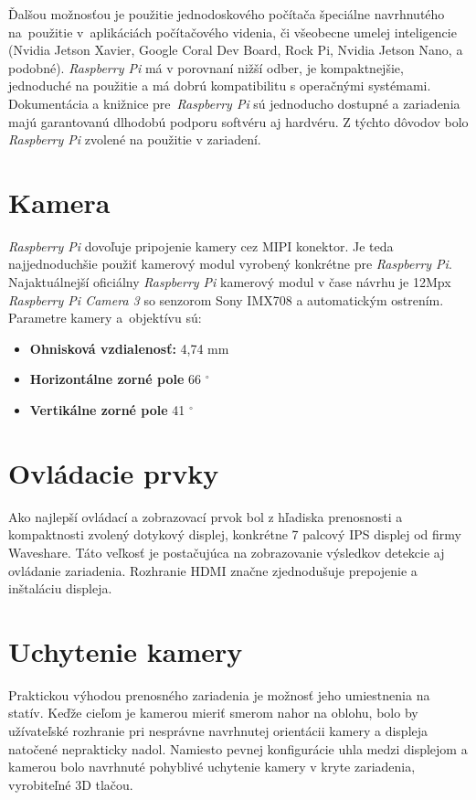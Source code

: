         Ďalšou možnosťou je použitie jednodoskového počítača špeciálne navrhnutého na~použitie v~aplikáciách počítačového videnia, či všeobecne umelej inteligencie (Nvidia Jetson Xavier, Google Coral Dev Board, Rock Pi, Nvidia Jetson Nano, a podobné). \emph{Raspberry Pi} má v porovnaní nižší odber, je kompaktnejšie, jednoduché na použitie a má dobrú kompatibilitu s operačnými systémami. Dokumentácia a knižnice pre~\emph{Raspberry Pi} sú jednoducho dostupné a zariadenia majú garantovanú dlhodobú podporu softvéru aj hardvéru. Z týchto dôvodov bolo \emph{Raspberry Pi} zvolené na použitie v zariadení.

    \section{Kamera}

        \emph{Raspberry Pi} dovoľuje pripojenie kamery cez MIPI konektor. Je teda najjednoduchšie použiť kamerový modul vyrobený konkrétne pre \emph{Raspberry Pi}. Najaktuálnejší oficiálny \emph{Raspberry Pi} kamerový modul v čase návrhu je 12Mpx \emph{Raspberry Pi Camera 3} so senzorom Sony IMX708 a automatickým ostrením. Parametre kamery a~objektívu sú:
        \begin{itemize}
            \item \textbf{Ohnisková vzdialenosť:} 4,74 mm
            \item \textbf{Horizontálne zorné pole} 66 \(^\circ\)
            \item \textbf{Vertikálne zorné pole} 41 \(^\circ\)
        \end{itemize}

    \section{Ovládacie prvky}

        Ako najlepší ovládací a zobrazovací prvok bol z hľadiska prenosnosti a kompaktnosti zvolený dotykový displej, konkrétne 7 palcový IPS displej od firmy Waveshare. Táto veľkosť je postačujúca na zobrazovanie výsledkov detekcie aj ovládanie zariadenia. Rozhranie HDMI značne zjednodušuje prepojenie a inštaláciu displeja.

    \section{Uchytenie kamery}

        Praktickou výhodou prenosného zariadenia je možnosť jeho umiestnenia na statív. Keďže cieľom je kamerou mieriť smerom nahor na oblohu, bolo by užívateľské rozhranie pri nesprávne navrhnutej orientácii kamery a displeja natočené neprakticky nadol. Namiesto pevnej konfigurácie uhla medzi displejom a kamerou bolo navrhnuté pohyblivé uchytenie kamery v kryte zariadenia, vyrobiteľné 3D tlačou.

